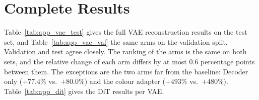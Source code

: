 \chapter{Complete Results}
\label{app:results}

Table~\ref{tab:app_vae_test} gives the full VAE reconstruction results on the
test set, and Table~\ref{tab:app_vae_val} the same arms on the validation split.
Validation and test agree closely. The ranking of the arms is the same on both
sets, and the relative change of each arm differs by at most 0.6 percentage
points between them. The exceptions are the two arms far from the baseline:
Decoder only ($+77.4\%$ vs.\ $+80.0\%$) and the colour adapter ($+493\%$ vs.\ $+480\%$).
Table~\ref{tab:app_dit} gives the DiT results per VAE.





